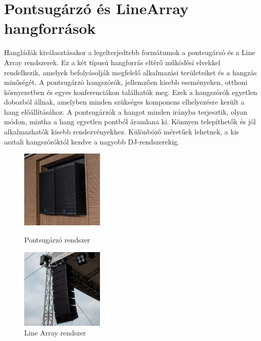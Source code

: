 \section{Pontsugárzó és LineArray hangforrások} %
Hangládák kiválasztásakor a legelterjedtebb formátumok a pontsugárzó és a Line Array rendszerek.
Ez a két típusú hangforrás eltérő működési elvekkel rendelkezik, 
amelyek befolyásolják megfelelő alkalmazási területeiket és a hangzás minőségét.
A pontsugárzó hangszórók, jellemzően kisebb eseményeken, 
otthoni környezetben és egyes konferenciákon találhatók meg. Ezek a hangszórók egyetlen 
dobozból állnak, amelyben minden szükséges komponens elhelyezésre került a hang előállításához. 
A pontsugárzók a hangot minden irányba terjesztik, olyan módon, mintha a hang egyetlen pontból áramlana ki. 
Könnyen telepíthetők és jól alkalmazhatók kisebb rendezvényekhez. Különböző méretűek 
lehetnek, a kis asztali hangszóróktól kezdve a nagyobb DJ-rendszerekig.
\begin{figure}[H]
	\begin{minipage}{0.5\textwidth}
		\centering
		\includegraphics[width=150px, keepaspectratio]{figures/point_source.jpg}
        \caption{Pontsugárzó rendszer}
        \label{fig:point_source}
	\end{minipage}%
	\begin{minipage}{0.5\textwidth}
		\centering
		\includegraphics[width=150px, keepaspectratio]{figures/line_array.jpg}
		\caption{Line Array rendszer}
        \label{fig:line_array}
	\end{minipage}
\end{figure}
